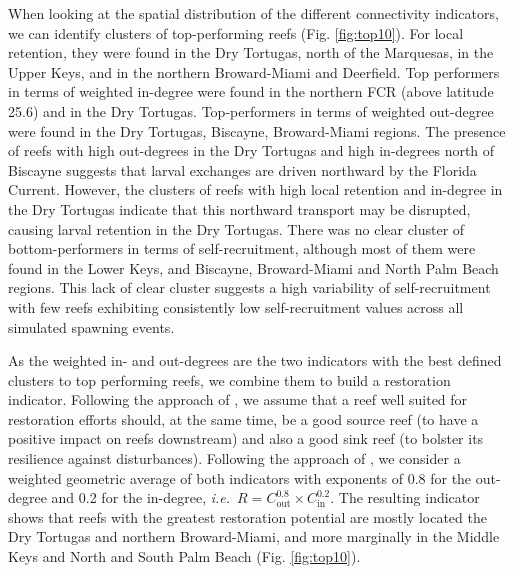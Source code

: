 \documentclass[preprint,12pt,authoryear]{elsarticle}
\newcommand{\ie}{{\it i.e.}\ }
\begin{document}
	When looking at the spatial distribution of the different connectivity indicators, we can identify clusters of top-performing reefs (Fig. \ref{fig:top10}). For local retention, they were found in the Dry Tortugas, north of the Marquesas, in the Upper Keys, and in the northern Broward-Miami and Deerfield. Top performers in terms of weighted in-degree were found in the northern FCR (above latitude 25.6) and in the Dry Tortugas. Top-performers in terms of weighted out-degree were found in the Dry Tortugas, Biscayne, Broward-Miami regions. The presence of reefs with high out-degrees in the Dry Tortugas and high in-degrees north of Biscayne suggests that larval exchanges are driven northward by the Florida Current. However, the clusters of reefs with high local retention and in-degree in the Dry Tortugas indicate that this northward transport may be disrupted, causing larval retention in the Dry Tortugas. There was no clear cluster of bottom-performers in terms of self-recruitment, although most of them were found in the Lower Keys, and Biscayne, Broward-Miami and North Palm Beach regions. This lack of clear cluster suggests a high variability of self-recruitment with few reefs exhibiting consistently low self-recruitment values across all simulated spawning events.
	
	As the weighted in- and out-degrees are the two indicators with the best defined clusters to top performing reefs, we combine them to build a restoration indicator. Following the approach of \cite{frys2020fine}, we assume that a reef well suited for restoration efforts should, at the same time, be a good source reef (to have a positive impact on reefs downstream) and also a good sink reef (to bolster its resilience against disturbances). Following the approach of \cite{tnc2024}, we consider a weighted geometric average of both indicators with exponents of 0.8 for the out-degree and 0.2 for the in-degree, \ie $R = C_\text{out}^{0.8} \times C_\text{in}^{0.2}$. The resulting indicator shows that reefs with the greatest restoration potential are mostly located the Dry Tortugas and northern Broward-Miami, and more marginally in the Middle Keys and North and South Palm Beach (Fig. \ref{fig:top10}).
	
\end{document}
